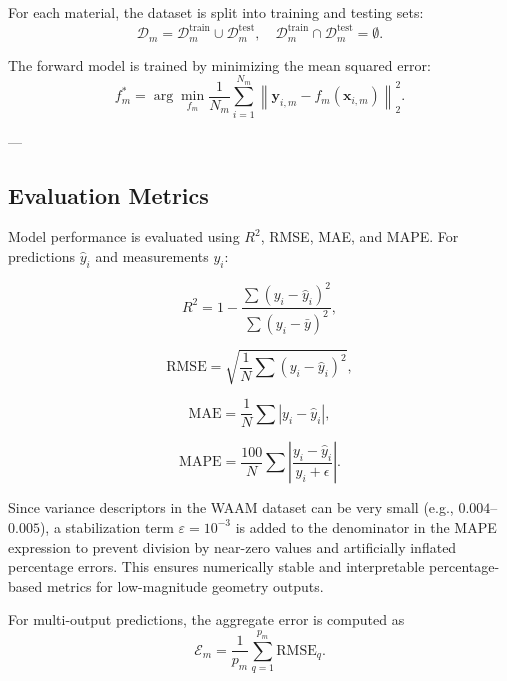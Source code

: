 \documentclass[11pt]{article}
\begin{document}
For each material, the dataset is split into training and testing sets:
\begin{equation}
\mathcal{D}_{m} =
\mathcal{D}_{m}^{\mathrm{train}} \cup \mathcal{D}_{m}^{\mathrm{test}},
\quad
\mathcal{D}_{m}^{\mathrm{train}} \cap \mathcal{D}_{m}^{\mathrm{test}} = \emptyset.
\end{equation}

The forward model is trained by minimizing the mean squared error:
\begin{equation}
f_m^{*} =
\arg\min_{f_m}
\frac{1}{N_m}
\sum_{i=1}^{N_m}
\left\|
\mathbf{y}_{i,m} - f_m(\mathbf{x}_{i,m})
\right\|_2^2.
\end{equation}

---

\subsection{Evaluation Metrics}\label{Evaluation Metrics}

Model performance is evaluated using $R^2$, RMSE, MAE, and MAPE. For predictions $\hat{y}_i$ and measurements $y_i$:

\begin{equation}
R^2 = 1 - \frac{\sum (y_i - \hat{y}_i)^2}{\sum (y_i - \bar{y})^2},
\end{equation}

\begin{equation}
\mathrm{RMSE} = \sqrt{\frac{1}{N} \sum (y_i - \hat{y}_i)^2},
\end{equation}

\begin{equation}
\mathrm{MAE} = \frac{1}{N} \sum |y_i - \hat{y}_i|,
\end{equation}

\begin{equation}
\mathrm{MAPE} =
\frac{100}{N}
\sum
\left|
\frac{y_i - \hat{y}_i}{y_i + \epsilon}
\right|.
\end{equation}

Since variance descriptors in the WAAM dataset can be very small (e.g., $0.004$--$0.005$), a stabilization term $\varepsilon = 10^{-3}$ is added to the denominator in the MAPE expression to prevent division by near-zero values and artificially inflated percentage errors. This ensures numerically stable and interpretable percentage-based metrics for low-magnitude geometry outputs.


For multi-output predictions, the aggregate error is computed as
\begin{equation}
\mathcal{E}_m =
\frac{1}{p_m}
\sum_{q=1}^{p_m}
\mathrm{RMSE}_q.
\end{equation}
\end{document}
